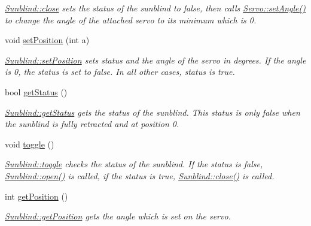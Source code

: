 \begin{DoxyCompactItemize}
\begin{DoxyCompactList}\small\item\em \hyperlink{class_sunblind_a4f5157b03235dbd04d2e9d23e5947b05}{Sunblind\+::close} sets the status of the sunblind to false, then calls \hyperlink{class_servo_aa8ccde828af12dfd201d716fbfe7a13e}{Servo\+::set\+Angle()} to change the angle of the attached servo to it\textquotesingle{}s minimum which is 0. \end{DoxyCompactList}\item 
void \hyperlink{class_sunblind_aca584d938d6c28ec02d80fb287504434}{set\+Position} (int a)
\begin{DoxyCompactList}\small\item\em \hyperlink{class_sunblind_aca584d938d6c28ec02d80fb287504434}{Sunblind\+::set\+Position} sets status and the angle of the servo in degrees. If the angle is 0, the status is set to false. In all other cases, status is true. \end{DoxyCompactList}\item 
bool \hyperlink{class_sunblind_a5473ade5297b3c33c1daa55d15b74e15}{get\+Status} ()
\begin{DoxyCompactList}\small\item\em \hyperlink{class_sunblind_a5473ade5297b3c33c1daa55d15b74e15}{Sunblind\+::get\+Status} gets the status of the sunblind. This status is only false when the sunblind is fully retracted and at position 0. \end{DoxyCompactList}\item 
\hypertarget{class_sunblind_a1f5b5179a2fe2c1d60a472f3e1ca64b7}{}void \hyperlink{class_sunblind_a1f5b5179a2fe2c1d60a472f3e1ca64b7}{toggle} ()\label{class_sunblind_a1f5b5179a2fe2c1d60a472f3e1ca64b7}

\begin{DoxyCompactList}\small\item\em \hyperlink{class_sunblind_a1f5b5179a2fe2c1d60a472f3e1ca64b7}{Sunblind\+::toggle} checks the status of the sunblind. If the status is false, \hyperlink{class_sunblind_a707f2bdcf9b98b362f1f71d05ff85465}{Sunblind\+::open()} is called, if the status is true, \hyperlink{class_sunblind_a4f5157b03235dbd04d2e9d23e5947b05}{Sunblind\+::close()} is called. \end{DoxyCompactList}\item 
int \hyperlink{class_sunblind_aace51cdde4d42624cbdda8171f33afba}{get\+Position} ()
\begin{DoxyCompactList}\small\item\em \hyperlink{class_sunblind_aace51cdde4d42624cbdda8171f33afba}{Sunblind\+::get\+Position} gets the angle which is set on the servo. \end{DoxyCompactList}\end{DoxyCompactItemize}


